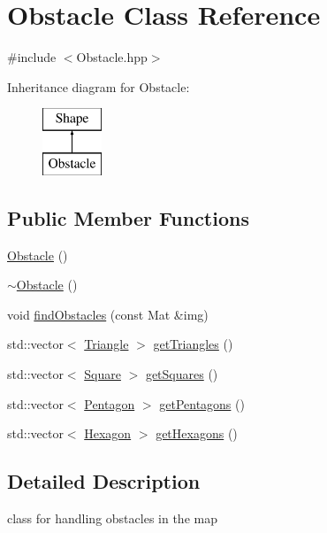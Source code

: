 \hypertarget{class_obstacle}{}\section{Obstacle Class Reference}
\label{class_obstacle}


{\ttfamily \#include $<$Obstacle.\+hpp$>$}

Inheritance diagram for Obstacle\+:\begin{figure}[H]
\begin{center}
\leavevmode
\includegraphics[height=2.000000cm]{class_obstacle}
\end{center}
\end{figure}
\subsection*{Public Member Functions}
\begin{DoxyCompactItemize}
\item 
\mbox{\hyperlink{class_obstacle_a8f734072321fa06a7b7dae2d5f50f352}{Obstacle}} ()
\item 
\mbox{\hyperlink{class_obstacle_af2f9cc9c6cff75dca0974fd5ac4f71a9}{$\sim$\+Obstacle}} ()
\item 
void \mbox{\hyperlink{class_obstacle_ae333b23b742b38e50be13bc7aec2da5b}{find\+Obstacles}} (const Mat \&img)
\item 
std\+::vector$<$ \mbox{\hyperlink{class_triangle}{Triangle}} $>$ \mbox{\hyperlink{class_obstacle_a4b995e62a7aece596b2e42c63cdf5e28}{get\+Triangles}} ()
\item 
std\+::vector$<$ \mbox{\hyperlink{class_square}{Square}} $>$ \mbox{\hyperlink{class_obstacle_a53daef38dbe68e85696abc8ed03cf4b2}{get\+Squares}} ()
\item 
std\+::vector$<$ \mbox{\hyperlink{class_pentagon}{Pentagon}} $>$ \mbox{\hyperlink{class_obstacle_a2a3f85aa41ff39922c3994154fa8a7c1}{get\+Pentagons}} ()
\item 
std\+::vector$<$ \mbox{\hyperlink{class_hexagon}{Hexagon}} $>$ \mbox{\hyperlink{class_obstacle_a472a93843d84f1275c5b9cd57aa53850}{get\+Hexagons}} ()
\end{DoxyCompactItemize}


\subsection{Detailed Description}
class for handling obstacles in the map 

